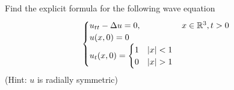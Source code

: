 Find the explicit formula for the following wave equation
$$
\begin{cases}
  u_{tt} - \Delta u = 0, & x \in \mathbb{R}^3, t > 0\\
  u(x, 0) = 0\\
  u_t(x, 0) =
  \begin{cases}
    1 & |x| < 1\\
    0 & |x| > 1
  \end{cases}
\end{cases}
$$
(Hint: $u$ is radially symmetric)
